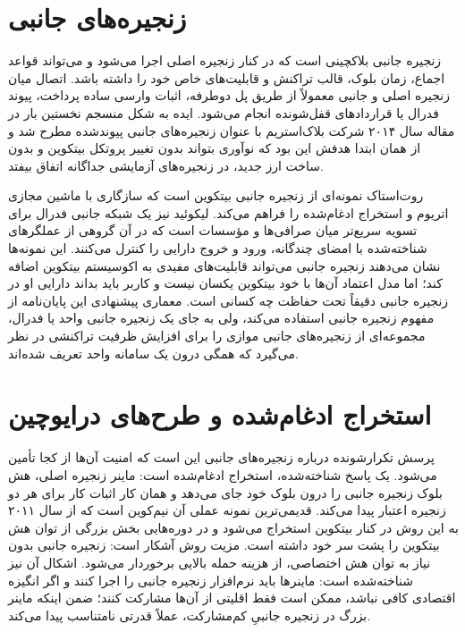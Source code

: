 \section{زنجیره‌های جانبی}

زنجیره جانبی بلاکچینی است که در کنار زنجیره اصلی اجرا می‌شود و می‌تواند قواعد اجماع، زمان بلوک، قالب تراکنش و قابلیت‌های خاص خود را داشته باشد. اتصال میان زنجیره اصلی و جانبی معمولاً از طریق پل دوطرفه، اثبات وارسی ساده پرداخت، پیوند فدرال یا قراردادهای قفل‌شونده انجام می‌شود. ایده به شکل منسجم نخستین بار در مقاله سال ۲۰۱۴ شرکت بلاک‌استریم با عنوان زنجیره‌های جانبی پیوندشده مطرح شد و از همان ابتدا هدفش این بود که نوآوری بتواند بدون تغییر پروتکل بیتکوین و بدون ساخت ارز جدید، در زنجیره‌های آزمایشی جداگانه اتفاق بیفتد.

روت‌استاک نمونه‌ای از زنجیره جانبی بیتکوین است که سازگاری با ماشین مجازی اتریوم و استخراج ادغام‌شده را فراهم می‌کند. لیکوئید نیز یک شبکه جانبی فدرال برای تسویه سریع‌تر میان صرافی‌ها و مؤسسات است که در آن گروهی از عملگرهای شناخته‌شده با امضای چندگانه، ورود و خروج دارایی را کنترل می‌کنند. این نمونه‌ها نشان می‌دهند زنجیره جانبی می‌تواند قابلیت‌های مفیدی به اکوسیستم بیتکوین اضافه کند؛ اما مدل اعتماد آن‌ها با خود بیتکوین یکسان نیست و کاربر باید بداند دارایی او در زنجیره جانبی دقیقاً تحت حفاظت چه کسانی است. معماری پیشنهادی این پایان‌نامه از مفهوم زنجیره جانبی استفاده می‌کند، ولی به جای یک زنجیره جانبی واحد یا فدرال، مجموعه‌ای از زنجیره‌های جانبی موازی را برای افزایش ظرفیت تراکنشی در نظر می‌گیرد که همگی درون یک سامانه واحد تعریف شده‌اند.

\section{استخراج ادغام‌شده و طرح‌های درایوچین}

پرسش تکرارشونده درباره زنجیره‌های جانبی این است که امنیت آن‌ها از کجا تأمین می‌شود. یک پاسخ شناخته‌شده، استخراج ادغام‌شده است: ماینر زنجیره اصلی، هش بلوک زنجیره جانبی را درون بلوک خود جای می‌دهد و همان کار اثبات کار برای هر دو زنجیره اعتبار پیدا می‌کند. قدیمی‌ترین نمونه عملی آن نیم‌کوین است که از سال ۲۰۱۱ به این روش در کنار بیتکوین استخراج می‌شود و در دوره‌هایی بخش بزرگی از توان هش بیتکوین را پشت سر خود داشته است. مزیت روش آشکار است: زنجیره جانبی بدون نیاز به توان هش اختصاصی، از هزینه حمله بالایی برخوردار می‌شود. اشکال آن نیز شناخته‌شده است: ماینرها باید نرم‌افزار زنجیره جانبی را اجرا کنند و اگر انگیزه اقتصادی کافی نباشد، ممکن است فقط اقلیتی از آن‌ها مشارکت کنند؛ ضمن اینکه ماینر بزرگ در زنجیره جانبیِ کم‌مشارکت، عملاً قدرتی نامتناسب پیدا می‌کند.

